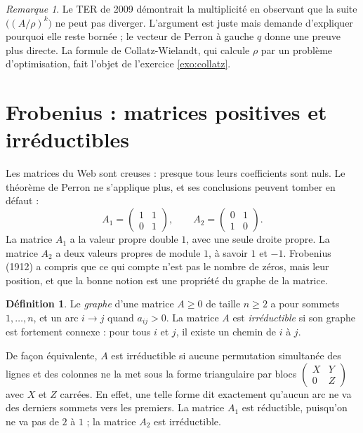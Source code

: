 \documentclass[11pt,a4paper]{article}
\theoremstyle{plain}
\theoremstyle{definition}
\newtheorem{definition}[theoreme]{Définition}
\theoremstyle{remark}
\newtheorem{remarque}[theoreme]{Remarque}
\begin{document}
\begin{remarque}
Le TER de 2009 démontrait la multiplicité en observant que la suite $\big((A/\rho)^k\big)$ ne peut pas diverger. L'argument est juste mais demande d'expliquer pourquoi elle reste bornée ; le vecteur de Perron à gauche $q$ donne une preuve plus directe. La formule de Collatz-Wielandt, qui calcule $\rho$ par un problème d'optimisation, fait l'objet de l'exercice \ref{exo:collatz}.
\end{remarque}

\section{Frobenius : matrices positives et irréductibles}

Les matrices du Web sont creuses : presque tous leurs coefficients sont nuls. Le théorème de Perron ne s'applique plus, et ses conclusions peuvent tomber en défaut :
\[
  A_1=\begin{pmatrix}1&1\\0&1\end{pmatrix},\qquad
  A_2=\begin{pmatrix}0&1\\1&0\end{pmatrix}.
\]
La matrice $A_1$ a la valeur propre double $1$, avec une seule droite propre. La matrice $A_2$ a deux valeurs propres de module $1$, à savoir $1$ et $-1$. Frobenius (1912) a compris que ce qui compte n'est pas le nombre de zéros, mais leur position, et que la bonne notion est une propriété du graphe de la matrice.

\begin{definition}
Le \emph{graphe} d'une matrice $A\geq0$ de taille $n\geq2$ a pour sommets $1,\dots,n$, et un arc $i\to j$ quand $a_{ij}>0$. La matrice $A$ est \emph{irréductible} si son graphe est fortement connexe : pour tous $i$ et $j$, il existe un chemin de $i$ à $j$.
\end{definition}

De façon équivalente, $A$ est irréductible si aucune permutation simultanée des lignes et des colonnes ne la met sous la forme triangulaire par blocs $\begin{pmatrix}X&Y\\0&Z\end{pmatrix}$ avec $X$ et $Z$ carrées. En effet, une telle forme dit exactement qu'aucun arc ne va des derniers sommets vers les premiers. La matrice $A_1$ est réductible, puisqu'on ne va pas de $2$ à $1$ ; la matrice $A_2$ est irréductible.
\end{document}
